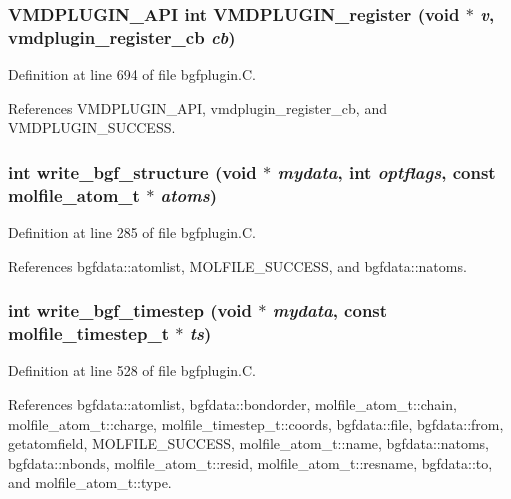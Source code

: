 \subsubsection{\setlength{\rightskip}{0pt plus 5cm}VMDPLUGIN\_\-API int VMDPLUGIN\_\-register (void $\ast$ {\em v}, {\bf vmdplugin\_\-register\_\-cb} {\em cb})}\label{bgfplugin_8C_a19}




Definition at line 694 of file bgfplugin.C.

References VMDPLUGIN\_\-API, vmdplugin\_\-register\_\-cb, and VMDPLUGIN\_\-SUCCESS.
\subsubsection{\setlength{\rightskip}{0pt plus 5cm}int write\_\-bgf\_\-structure (void $\ast$ {\em mydata}, int {\em optflags}, const {\bf molfile\_\-atom\_\-t} $\ast$ {\em atoms})\hspace{0.3cm}{\tt  [static]}}\label{bgfplugin_8C_a9}




Definition at line 285 of file bgfplugin.C.

References bgfdata::atomlist, MOLFILE\_\-SUCCESS, and bgfdata::natoms.
\subsubsection{\setlength{\rightskip}{0pt plus 5cm}int write\_\-bgf\_\-timestep (void $\ast$ {\em mydata}, const {\bf molfile\_\-timestep\_\-t} $\ast$ {\em ts})\hspace{0.3cm}{\tt  [static]}}\label{bgfplugin_8C_a14}




Definition at line 528 of file bgfplugin.C.

References bgfdata::atomlist, bgfdata::bondorder, molfile\_\-atom\_\-t::chain, molfile\_\-atom\_\-t::charge, molfile\_\-timestep\_\-t::coords, bgfdata::file, bgfdata::from, getatomfield, MOLFILE\_\-SUCCESS, molfile\_\-atom\_\-t::name, bgfdata::natoms, bgfdata::nbonds, molfile\_\-atom\_\-t::resid, molfile\_\-atom\_\-t::resname, bgfdata::to, and molfile\_\-atom\_\-t::type.
